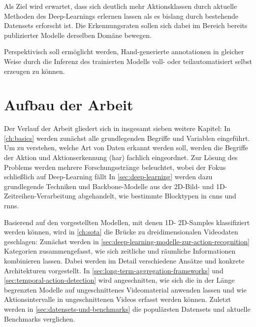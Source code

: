 Als Ziel wird erwartet, dass sich deutlich mehr Aktionsklassen durch aktuelle Methoden des Deep-Learnings erlernen lassen als es bislang durch bestehende Datensets erforscht ist.
Die Erkennungsraten sollen sich dabei im Bereich bereits publizierter Modelle derselben Domäne bewegen.

Perspektivisch soll ermöglicht werden, Hand-generierte \gls{annotationen} in gleicher Weise durch die Inferenz des trainierten Modells voll- oder teilautomatisiert selbst erzeugen zu können.

\section{Aufbau der Arbeit}
\label{sec:aufbau-der-arbeit}

Der Verlauf der Arbeit gliedert sich in insgesamt sieben weitere Kapitel:
In \autoref{ch:basics} werden zunächst alle grundlegenden Begriffe und Variablen eingeführt.
Um zu verstehen, welche Art von Daten erkannt werden soll, werden die Begriffe der Aktion und Aktionserkennung (\gls{har}) fachlich eingeordnet.
Zur Lösung des Problems werden mehrere Forschungsstränge beleuchtet, wobei der Fokus schließlich auf Deep-Learning fällt
In \autoref{sec:deep-learning} werden dazu grundlegende Techniken und Backbone-Modelle aus der 2D-Bild- und 1D-Zeitreihen-Verarbeitung abgehandelt, wie bestimmte Blocktypen in \glspl{cnn} und \glspl{rnn}.

Basierend auf den vorgestellten Modellen, mit denen 1D- \bzw 2D-Samples klassifiziert werden können, wird in \autoref{ch:sota} die Brücke zu dreidimensionalen Videodaten geschlagen:
Zunächst werden in \autoref{sec:deep-learning-modelle-zur-action-recognition} Kategorien zusammengefasst, wie sich zeitliche und räumliche Informationen kombinieren lassen.
Dabei werden im Detail verschiedene Ansätze und konkrete Architekturen vorgestellt.
In \autoref{sec:long-term-aggregation-frameworks} und \autoref{sec:temporal-action-detection} wird angeschnitten, wie sich die in der Länge begrenzten Modelle auf ungeschnittenes Videomaterial anwenden lassen und wie Aktionsintervalle in ungeschnittenen Videos erfasst werden können.
Zuletzt werden in \autoref{sec:datensets-und-benchmarks} die populärsten Datensets und aktuelle Benchmarks verglichen.

